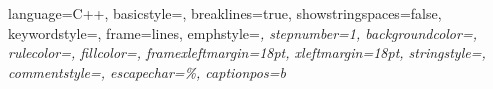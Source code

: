 
{
  language=C++,
  basicstyle=\ttfamily,
  breaklines=true,
  showstringspaces=false,
  keywordstyle=\color{Mulberry},
  frame=lines,
  emphstyle=\itshape,
  stepnumber=1,
  backgroundcolor=\color{blue!10},
  rulecolor=\color{blue!50},
  fillcolor=\color{blue!20},
  framexleftmargin=18pt,
  xleftmargin=18pt,
  stringstyle=\color{BrickRed},
  commentstyle=\color{BrickRed},
  escapechar=\%,
  captionpos=b
}
